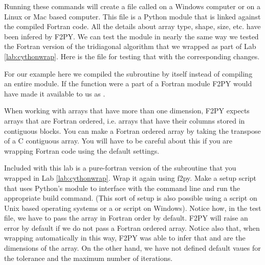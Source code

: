 Running these commands will create a file called  on a Windows computer or  on a Linux or Mac based computer.
This file is a Python module that is linked against the compiled Fortran code.
All the details about array type, shape, size, etc. have been infered by F2PY.
We can test the module in nearly the same way we tested the Fortran version of the tridiagonal algorithm that we wrapped as part of Lab \ref{lab:cythonwrap}.
Here is the file for testing that with the corresponding changes.

\begin{info}
For our example here we compiled the subroutine by itself instead of compiling an entire module.
If the function were a part of a Fortran module  F2PY would have made it available to us as .
\end{info}

\begin{warn}
When working with arrays that have more than one dimension, F2PY expects arrays that are Fortran ordered, i.e. arrays that have their columns stored in contiguous blocks.
You can make a Fortran ordered array by taking the transpose of a C contiguous array.
You will have to be careful about this if you are wrapping Fortran code using the default settings.
\end{warn}

\begin{problem}
Included with this lab is a pure-fortran version of the  subroutine that you wrapped in Lab \ref{lab:cythonwrap}.
Wrap it again using f2py.
Make a setup script that uses Python's  module to interface with the command line and run the appropriate build command.
(This sort of setup is also possible using a  script on Unix based operating systems or a  or  script on Windows).
Notice how, in the test file, we have to pass the array in Fortran order by default.
F2PY will raise an error by default if we do not pass a Fortran ordered array.
Notice also that, when wrapping automatically in this way, F2PY was able to infer that  and  are the dimensions of the array.
On the other hand, we have not defined default vaues for the tolerance and the maximum number of iterations.
\end{problem}




